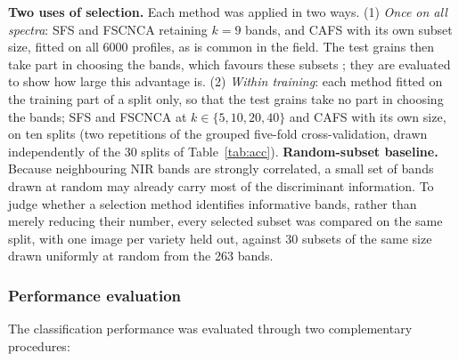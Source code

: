 \documentclass[final,5p,times,twocolumn]{elsarticle}
\newcommand{\added}[1]{{\color{blue}#1}}
\begin{document}
\added{\textbf{Two uses of selection.} Each method was applied in two ways. (1) \emph{Once on all spectra}: SFS and FSCNCA retaining $k=9$ bands, and CAFS with its own subset size, fitted on all 6000 profiles, as is common in the field. The test grains then take part in choosing the bands, which favours these subsets \citep{Varma2006}; they are evaluated to show how large this advantage is. (2) \emph{Within training}: each method fitted on the training part of a split only, so that the test grains take no part in choosing the bands; SFS and FSCNCA at $k\in\{5,10,20,40\}$ and CAFS with its own size, on ten splits (two repetitions of the grouped five-fold cross-validation, drawn independently of the 30 splits of Table~\ref{tab:acc}).}
\added{\textbf{Random-subset baseline.} Because neighbouring NIR bands are strongly correlated, a small set of bands drawn at random may already carry most of the discriminant information. To judge whether a selection method identifies informative bands, rather than merely reducing their number, every selected subset was compared on the same split, with one image per variety held out, against 30 subsets of the same size drawn uniformly at random from the 263 bands.}

\subsubsection{Performance evaluation}\label{sec_performance}

The classification performance was evaluated through two complementary procedures: 
\end{document}
